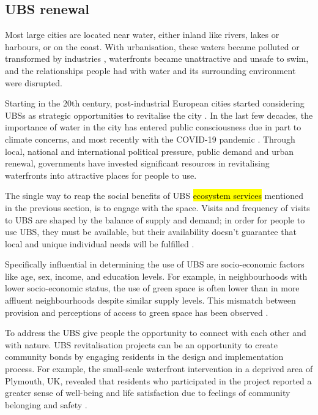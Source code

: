 \documentclass{article}
\begin{document}
\subsection{UBS renewal}

Most large cities are located near water, either inland like rivers, lakes or harbours, or on the coast. With urbanisation, these waters became polluted or transformed by industries \parencite{kampa_langaas_anzaldua_2016}, waterfronts became unattractive and unsafe to swim, and the relationships people had with water and its surrounding environment were disrupted.

Starting in the 20th century, post-industrial European cities started considering UBSs as strategic opportunities to revitalise the city \parencite{del2021dismantling}. In the last few decades, the importance of water in the city has entered public consciousness due in part to climate concerns, and most recently with the COVID-19 pandemic \parencite{kohsaka2021urban}.
Through local, national and international political pressure, public demand and urban renewal, governments have invested significant resources in revitalising waterfronts into attractive places for people to use.

The single way to reap the social benefits of UBS \hl{ecosystem services} mentioned in the previous section, is to engage with the space. Visits and frequency of visits to UBS are shaped by the balance of supply and demand; in order for people to use UBS, they must be available, but their availability doesn't guarantee that local and unique individual needs will be fulfilled \parencite{phillips2021use}. 

Specifically influential in determining the use of UBS are socio-economic factors like age, sex, income, and education levels. For example, in neighbourhoods with lower socio-economic status, the use of green space is often lower than in more affluent neighbourhoods despite similar supply levels. This mismatch between provision and perceptions of access to green space has been observed  \parencite{wang2015comparison}.

To address the UBS give people the opportunity to connect with each other and with nature. UBS revitalisation projects can be an opportunity to create community bonds by engaging residents in the design and implementation process. For example, the small-scale waterfront intervention in a deprived area of Plymouth, UK, revealed that residents who participated in the project reported a greater sense of well-being and life satisfaction due to feelings of community belonging and safety \parencite{van2021urban}.
\end{document}
